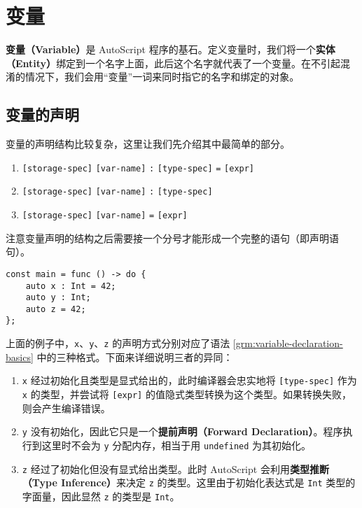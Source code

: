 \section{变量}

\textbf{变量（Variable）}是 AutoScript 程序的基石。定义变量时，我们将一个\textbf{实体（Entity）}绑定到一个名字上面，此后这个名字就代表了一个变量。在不引起混淆的情况下，我们会用“变量”一词来同时指它的名字和绑定的对象。

\subsection{变量的声明}

变量的声明结构比较复杂，这里让我们先介绍其中最简单的部分。

\begin{grammar} \label{grm:variable-declaration-basics}
\begin{enumerate}
	\item \texttt{[storage-spec]} \texttt{[var-name]} \lstinline!:! \texttt{[type-spec]} \lstinline!=! \texttt{[expr]}
	\item \texttt{[storage-spec]} \texttt{[var-name]} \lstinline!:! \texttt{[type-spec]}
	\item \texttt{[storage-spec]} \texttt{[var-name]} \lstinline!=! \texttt{[expr]}
\end{enumerate}
\end{grammar}

注意变量声明的结构之后需要接一个分号才能形成一个完整的语句（即声明语句）。

\begin{lstlisting}
const main = func () -> do {
    auto x : Int = 42;
    auto y : Int;
    auto z = 42;
};
\end{lstlisting}

上面的例子中，\lstinline!x!、\lstinline!y!、\lstinline!z! 的声明方式分别对应了语法 \ref{grm:variable-declaration-basics} 中的三种格式。下面来详细说明三者的异同：

\begin{enumerate}
    \item \lstinline!x! 经过初始化且类型是显式给出的，此时编译器会忠实地将 \lstinline![type-spec]! 作为 \lstinline!x! 的类型，并尝试将 \lstinline![expr]! 的值隐式类型转换为这个类型。如果转换失败，则会产生编译错误。

    \item \lstinline!y! 没有初始化，因此它只是一个\textbf{提前声明（Forward Declaration）}。程序执行到这里时不会为 \lstinline!y! 分配内存，相当于用 \lstinline!undefined! 为其初始化。

    \item \lstinline!z! 经过了初始化但没有显式给出类型。此时 AutoScript 会利用\textbf{类型推断（Type Inference）}来决定 \lstinline!z! 的类型。这里由于初始化表达式是 \lstinline!Int! 类型的字面量，因此显然 \lstinline!z! 的类型是 \lstinline!Int!。
\end{enumerate}


